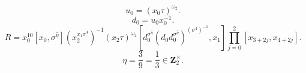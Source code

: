 \[u_0=(x_0\tau)^{\omega_2}.\]
\[d_0=u_0x_0^{-1}.\]
\[R=x_0^{10}[x_0,\sigma^{\widehat{\eta}}](x_2^{x_1\sigma^4})^{-1}(x_2\tau)^{\omega_2}[d_0^{\sigma^{\widehat{\eta}}}(d_0d_0^{\sigma^{\widehat{\eta}}})^{(\sigma^4)^{-1}},x_1]\prod_{j=0}^2[x_{3+2j},x_{4+2j}].\]
\[\eta=\frac{3}{9}=\frac{1}{3}\in\mathbf Z_2^\times.\]
